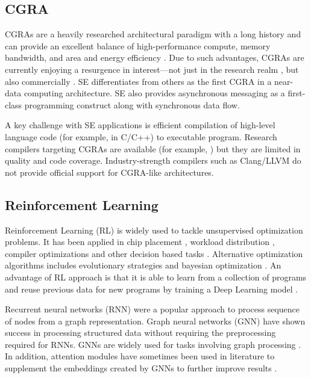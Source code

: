 \subsection{CGRA}
CGRAs are a heavily researched architectural paradigm with a long history and can provide an excellent balance of high-performance compute, memory bandwidth, and area and energy efficiency \cite{theodoridis2007survey}.
Due to such advantages, CGRAs are currently enjoying a resurgence in interest—not just in the research realm \cite{prabhakar2018plasticine}, but also commercially \cite{morgan2018intel, nicol2017coarse, vissers2019versal}.
SE differentiates from others as the first CGRA in a near-data computing architecture.
SE also provides asynchronous messaging as a first-class programming construct along with synchronous data flow. 

A key challenge with SE applications is efficient compilation of high-level language code (for example, in C/C++) to executable program. 
Research compilers targeting CGRAs are available (for example, \cite{adriaansen2016code, chin2017cgra, mei2003exploiting, prabhakar2018plasticine}) but they are limited in quality and code coverage. 
Industry-strength compilers such as Clang/LLVM do not provide official support for CGRA-like architectures.
\subsection{Reinforcement Learning}
Reinforcement Learning (RL) is widely used to tackle unsupervised optimization problems. It has been applied in chip placement \cite{mirhoseini2020chip}, 
workload distribution \cite{Mirhoseini_placementRNN, addanki2019placeto, zhou2019gdp}, compiler optimizations \cite{Zhou_compileGNN} and 
other decision based tasks \cite{kormushev2013reinforcement, ZophL16_NASRL}. Alternative optimization algorithms includes 
evolutionary strategies \cite{Zhichao_ESNAS} and bayesian optimization \cite{shi2020learned}. An advantage of RL approach is that it is able to learn from a collection of programs and reuse previous data for new programs by training a Deep Learning model \cite{zhou2019gdp}.

Recurrent neural networks (RNN) \cite{hochreiter1996lstm} were a popular approach to process sequence of nodes from a graph representation. 
Graph neural networks (GNN) \cite{gori2005new} have shown success in processing structured data without requiring the preprocessing required for RNNs.
GNNs are widely used for tasks involving graph processing \cite{Zhou_compileGNN, zhou2019gdp}. 
In addition, attention modules have sometimes been used in literature to supplement the embeddings created by GNNs to further improve results \cite{addanki2019placeto}.

